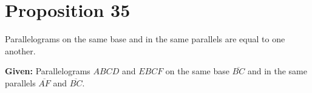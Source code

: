 
\section*{Proposition 35}

\begin{thm}
Parallelograms on the same base and in the same parallels are equal to one another.
\end{thm}

\begin{figure}[H]
	\caption{}
\end{figure}

\textbf{Given:} Parallelograms $ABCD$ and $EBCF$ on the same base $\overline{BC}$ and in the same parallels $\overline{AF}$ and $\overline{BC}$.

